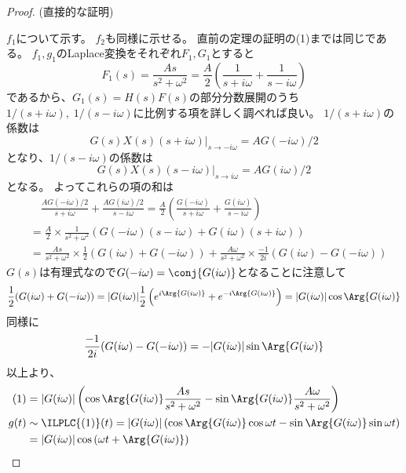 			\begin{proof}
				(直接的な証明)
				\quad\par
				$f_1$について示す。
				$f_2$も同様に示せる。
				直前の定理の証明の(1)までは同じである。
				$f_1,g_1$のLaplace変換をそれぞれ$F_1,G_1$とすると
				\[ F_1(s) = \frac{As}{s^2+\omega^2} = \frac{A}{2}\left(\frac{1}{s+i\omega} + \frac{1}{s-i\omega}\right) \]
				であるから、$G_1(s) = H(s)F(s)$の部分分数展開のうち$1/(s+i\omega),\;1/(s-i\omega)$に比例する項を詳しく調べれば良い。
				$1/(s+i\omega)$の係数は
				\[ \left. G(s)X(s)(s+i\omega) \right|_{s\to-i\omega} = AG(-i\omega)/2\]
				となり、$1/(s-i\omega)$の係数は
				\[ \left. G(s)X(s)(s-i\omega) \right|_{s\to i\omega} = AG(i\omega)/2\]
				となる。
				よってこれらの項の和は
				\begin{align}
					&\quad \frac{AG(-i\omega)/2}{s+i\omega} + \frac{AG(i\omega)/2}{s-i\omega} = \frac{A}{2}\left(\frac{G(-i\omega)}{s+i\omega} + \frac{G(i\omega)}{s-i\omega}\right) \nonumber\\
					&= \frac{A}{2}\times\frac{1}{s^2+\omega^2}\left(G(-i\omega)(s-i\omega) + G(i\omega)(s+i\omega)\right) \nonumber\\
					&= \frac{As}{s^2+\omega^2}\times\frac{1}{2}(G(i\omega)+G(-i\omega)) + \frac{A\omega}{s^2+\omega^2}\times\frac{-1}{2i}(G(i\omega)-G(-i\omega))
				\end{align}
				$G(s)$は有理式なので$G(-i\omega) = \conj{G(i\omega)}$となることに注意して
				\[ \frac{1}{2}(G(i\omega)+G(-i\omega)) = |G(i\omega)|\frac{1}{2}\left(e^{i\Arg{G(i\omega)}} + e^{-i\Arg{G(i\omega)}}\right) = |G(i\omega)|\cos\Arg{G(i\omega)} \]
				同様に
				\[ \frac{-1}{2i}(G(i\omega)-G(-i\omega)) = -|G(i\omega)|\sin\Arg{G(i\omega)} \]
				以上より、
				\begin{align*}
					(1) &= |G(i\omega)|\left(\cos\Arg{G(i\omega)}\frac{As}{s^2+\omega^2} - \sin\Arg{G(i\omega)}\frac{A\omega}{s^2+\omega^2} \right) \\
					g(t) &\sim \ILPLC{(1)}(t) = |G(i\omega)|\left(\cos\Arg{G(i\omega)}\cos\omega t - \sin\Arg{G(i\omega)}\sin\omega t \right) \\
					&= |G(i\omega)|\cos\left(\omega t + \Arg{G(i\omega)}\right)
				\end{align*}
			\end{proof}